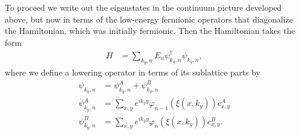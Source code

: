 \documentclass[reprint,amsmath,amssymb,aps,prl,groupedaddress,nofootinbib,superscriptaddress]{revtex4-1}
\newcommand{\1}{\mathds{1}}
\begin{document}
To proceed we write out the eigenstates in the continuum picture developed above, but now in terms of the low-energy fermionic operators that diagonalize the Hamiltonian, which was initially fermionic. 
Then the Hamiltonian takes the form%
\begin{align}
H &= \sum_{k_y,n} E_{n} \psi^\dagger_{k_y,n} \psi_{k_y,n},
\end{align} 
where we define a lowering operator in terms of its sublattice parts by
\begin{align}
\psi_{k_y,n} &= \psi_{k_y,n}^A + \psi_{k_y,n}^B \\
\psi_{k_y,n}^A &= \sum_{x,y} e^{ik_y y} \varphi_{n-1}(\xi(x,k_y)) c_{x,y}^A \\
\psi_{k_y,n}^B &= \sum_{x,y} e^{ik_y y} \varphi_{n}(\xi(x,k_y)) c_{x,y}^B.
\end{align}
\end{document}
